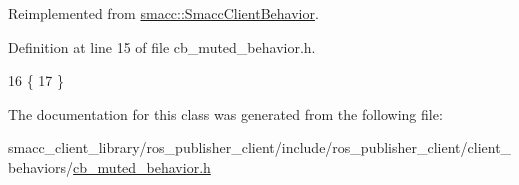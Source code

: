 Reimplemented from \hyperlink{classsmacc_1_1SmaccClientBehavior_a7e4fb6ce81ff96dc172425852d69c0c5}{smacc\+::\+Smacc\+Client\+Behavior}.



Definition at line 15 of file cb\+\_\+muted\+\_\+behavior.\+h.


\begin{DoxyCode}
16     \{
17     \}
\end{DoxyCode}


The documentation for this class was generated from the following file\+:\begin{DoxyCompactItemize}
\item 
smacc\+\_\+client\+\_\+library/ros\+\_\+publisher\+\_\+client/include/ros\+\_\+publisher\+\_\+client/client\+\_\+behaviors/\hyperlink{cb__muted__behavior_8h}{cb\+\_\+muted\+\_\+behavior.\+h}\end{DoxyCompactItemize}
